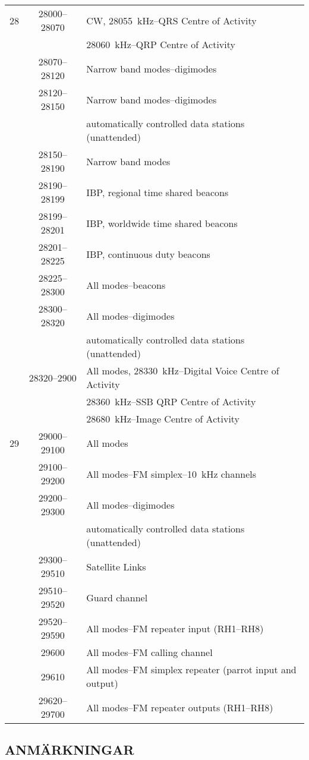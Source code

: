 \begin{longtable}{lcl}
28   & 28000--28070 & CW, 28055~kHz--QRS Centre of Activity\\
 & & 28060~kHz--QRP Centre of Activity\\
     & 28070--28120 & Narrow band modes--digimodes\\
     & 28120--28150 & Narrow band modes--digimodes\\
     & & automatically controlled data stations (unattended)\\
     & 28150--28190 & Narrow band modes\\
     & 28190--28199 & IBP, regional time shared beacons\\
     & 28199--28201 & IBP, worldwide time shared beacons\\
     & 28201--28225 & IBP, continuous duty beacons\\
     & 28225--28300 & All modes--beacons\\
     & 28300--28320 & All modes--digimodes\\
     & & automatically controlled data stations (unattended)\\
     & 28320--2900 & All modes, 28330~kHz--Digital Voice Centre of Activity\\
     & & 28360~kHz--SSB QRP Centre of Activity\\
     & & 28680~kHz--Image Centre of Activity\\

29   & 29000--29100 & All modes\\
     & 29100--29200 & All modes--FM simplex--10~kHz channels\\
     & 29200--29300 & All modes--digimodes\\
     & & automatically controlled data stations (unattended)\\
     & 29300--29510 & Satellite Links\\
     & 29510--29520 & Guard channel\\
     & 29520--29590 & All modes--FM repeater input (RH1--RH8)\\
     & 29600 & All modes--FM calling channel\\
     & 29610 & All modes--FM simplex repeater (parrot input and output)\\
& 29620--29700 & All modes--FM repeater outputs (RH1--RH8)\\
\end{longtable}

\subsection{ANMÄRKNINGAR}

